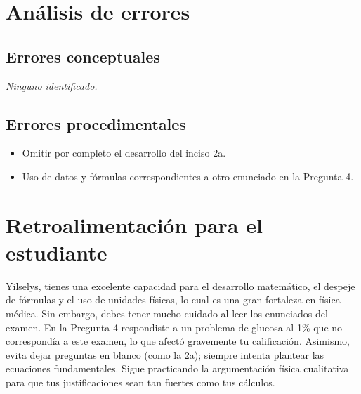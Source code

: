 \documentclass[11pt,a4paper]{article}
\begin{document}
\section*{Análisis de errores}

\subsection*{Errores conceptuales}
\textit{Ninguno identificado.}

\subsection*{Errores procedimentales}
\begin{itemize}[leftmargin=1.5em, itemsep=2pt]
  \item Omitir por completo el desarrollo del inciso 2a.
  \item Uso de datos y fórmulas correspondientes a otro enunciado en la Pregunta 4.
\end{itemize}

\section*{Retroalimentación para el estudiante}
\begin{tcolorbox}[cajaRecomendacion, title={Dirigido a: Yilselys Naranjo}]
Yilselys, tienes una excelente capacidad para el desarrollo matemático, el despeje de fórmulas y el uso de unidades físicas, lo cual es una gran fortaleza en física médica. Sin embargo, debes tener mucho cuidado al leer los enunciados del examen. En la Pregunta 4 respondiste a un problema de glucosa al 1\% que no correspondía a este examen, lo que afectó gravemente tu calificación. Asimismo, evita dejar preguntas en blanco (como la 2a); siempre intenta plantear las ecuaciones fundamentales. Sigue practicando la argumentación física cualitativa para que tus justificaciones sean tan fuertes como tus cálculos.
\end{tcolorbox}

\end{document}
